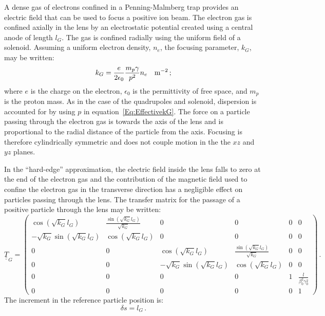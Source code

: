 A dense gas of electrons confined in a Penning-Malmberg trap provides
an electric field that can be used to focus a positive ion beam.
The electron gas is confined axially in the lens by an electrostatic 
potential created using a central anode of length $l_G$.
The gas is confined radially using the uniform field of a solenoid.
Assuming a uniform electron density, $n_e$, the focusing parameter,
$k_G$, may be written:
\begin{equation}
  k_G = \frac{e}{2\epsilon_0} \frac{m_p \gamma}{p^2} n_e
                              \quad {\rm m}^{-2}
                              \, ; \label{Eq:EffectivekG}
\end{equation}
where $e$ is the charge on the electron, $\epsilon_0$ is the
permittivity of free space, and $m_p$ is the proton mass.
As in the case of the quadrupoles and solenoid, dispersion is
accounted for by using $p$ in equation~\ref{Eq:EffectivekG}.
The force on a particle passing through the electron gas is towards
the axis of the lens and is proportional to the radial distance of the
particle from the axis.
Focusing is therefore cylindrically symmetric and does not couple
motion in the the $xz$ and $yz$ planes.

In the ``hard-edge'' approximation, the electric field inside the
lens falls to zero at the end of the electron gas and the contribution
of the magnetic field used to confine the electron gas in the
transverse direction has a negligible effect on particles passing
through the lens.
The transfer matrix for the passage of a positive particle through the
lens may be written: 
\begin{equation}
  \underline{\underline{T}}_{G} =
    \begin{pmatrix}
                    \cos(\sqrt{k_G} l_G) & \frac{\sin(\sqrt{k_G} l_G)}{\sqrt{k_G}} &  0 & 0 & 0 & 0 \\
        -\sqrt{k_G} \sin(\sqrt{k_G} l_G) &                    \cos(\sqrt{k_G} l_G) &  0 & 0 & 0 & 0 \\
                                     0 &                                     0 &              \cos(\sqrt{k_G} l_G) & \frac{\sin(\sqrt{k_G} l_G)}{\sqrt{k_G}}  & 0 & 0 \\
                                     0 &                                     0 &  -\sqrt{k_G} \sin(\sqrt{k_G} l_G) &                     \cos(\sqrt{k_G} l_G) & 0 & 0 \\
          0 & 0 & 0 & 0 & 1 & \frac{l}{\beta_0^2 \gamma_0^2} \\
          0 & 0 & 0 & 0 & 0 &                             1
        \end{pmatrix} \, .
\end{equation}
The increment in the reference particle position is:
\begin{equation}
  \delta s = l_G \, .
\end{equation}

